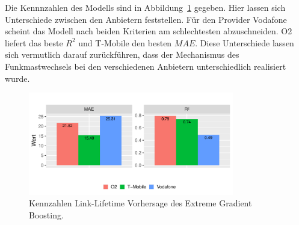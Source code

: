 Die Kennnzahlen des Modells sind in Abbildung~\ref{fig:kennzahlen-link-lifetime} gegeben.
Hier lassen sich Unterschiede zwischen den Anbietern feststellen. F\"ur den Provider Vodafone scheint das Modell nach beiden
Kriterien am schlechtesten abzuschneiden. O2 liefert das beste $R^2$ und T-Mobile den besten $MAE$.
Diese Unterschiede lassen sich vermutlich darauf zur\"uckf\"uhren, dass der Mechanismus des Funkmastwechsels bei den verschiedenen
Anbietern unterschiedlich realisiert wurde.
\begin{figure}
    \centering
    \includegraphics[width=0.8\textwidth]{abbildungen/kennzahlen_linklifetime}
    \caption{Kennzahlen Link-Lifetime Vorhersage des Extreme Gradient Boosting.}
    \label{fig:kennzahlen-link-lifetime}
\end{figure}

